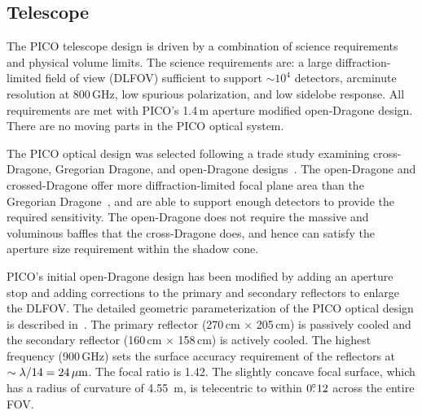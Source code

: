\subsection{Telescope}
\label{sec:telescope} %


The PICO telescope design is driven by a combination of science requirements and physical volume limits. The science requirements are: a large diffraction-limited field of view (DLFOV) sufficient to support $\sim10^4$ detectors, arcminute resolution at 800\,GHz, low spurious polarization, and low sidelobe response. All requirements are met with PICO's 1.4\,m aperture modified open-Dragone design. There are no moving parts in the PICO optical system.



The PICO optical design was selected following a trade study examining cross-Dragone, Gregorian Dragone, and open-Dragone designs~\citep{Young2018}.  The open-Dragone and crossed-Dragone offer more diffraction-limited focal plane area than the Gregorian Dragone~\citep{deBernardis2018}, and are able to support enough detectors to provide the required sensitivity. The open-Dragone does not require the massive and voluminous baffles that the cross-Dragone does, and hence can satisfy the aperture size requirement within the shadow cone.

PICO's initial open-Dragone design has been modified by adding an aperture stop and adding corrections to the primary and secondary reflectors to enlarge the DLFOV. The detailed geometric parameterization of the PICO optical design is described in~\citep{Young2018}. The primary reflector (270\,cm $\times$ 205\,cm) is passively cooled and the secondary reflector (160\,cm $\times$ 158\,cm) is actively cooled. The highest frequency (900\,GHz) sets the surface accuracy requirement of the reflectors at $\sim \lambda/14 =24\,\mu{\rm m}$. The focal ratio is 1.42. The slightly concave focal surface, which has a radius of curvature of 4.55~m, is telecentric to within $0.\!\!^\circ12$ across the entire FOV.

